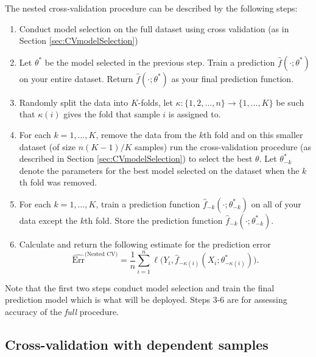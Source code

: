 The nested cross-validation procedure can be described by the following steps:
\begin{enumerate}
\item Conduct model selection on the full dataset using cross validation (as in Section \ref{sec:CVmodelSelection})
\item Let $\theta^*$ be the model selected in the previous step. Train a prediction $\hat{f}(\cdot ; \theta^*)$ on your entire dataset. Return $\hat{f}(\cdot ; \theta^*)$ as your final prediction function.
\item Randomly split the data into $K$-folds, let $\kappa: \{1,2,\dots, n \} \to \{1,\dots,K \}$ be such that $\kappa(i)$ gives the fold that sample $i$ is assigned to. 
\item For each $k=1,\dots,K$, remove the data from the $k$th fold and on this smaller dataset (of size $n(K-1)/K$ samples) run the cross-validation procedure (as described in Section \ref{sec:CVmodelSelection}) to select the best $\theta$. Let $\theta_{-k}^*$ denote the parameters for the best model selected on the dataset when the $k$th fold was removed.
\item For each $k=1,\dots,K$,  train a prediction function $\hat{f}_{-k}(\cdot ; \theta_{-k}^*)$ on all of your data except the $k$th fold. Store the prediction function $\hat{f}_{-k}(\cdot ; \theta_{-k}^*)$.
\item Calculate and return the following estimate for the prediction error $$\widehat{\text{Err}}^{\text{(Nested CV)}} =  \frac{1}{n} \sum_{i=1}^n \ell \Big( Y_i, \hat{f}_{-\kappa(i)}( X_i; \theta_{-\kappa(i)}^*) \Big).$$

\end{enumerate}



Note that the first two steps conduct model selection and train the final prediction model which is what will be deployed. Steps 3-6 are for assessing accuracy of the \textit{full} procedure.

\subsection{Cross-validation with dependent samples}

